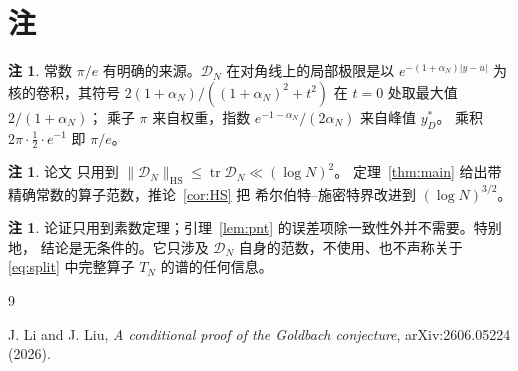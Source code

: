 \documentclass[12pt,a4paper]{amsart}
\numberwithin{equation}{section}
\theoremstyle{plain}
\theoremstyle{definition}
\newtheorem{remark}[theorem]{注}
\newcommand{\HS}{\mathrm{HS}}
\begin{document}
\section{注}\label{sec:remarks}

\begin{remark}\label{rem:constant}
常数 $\pi/e$ 有明确的来源。$\mathscr D_N$ 在对角线上的局部极限是以
$e^{-(1+\alpha_N)|y-u|}$ 为核的卷积，其符号
$2(1+\alpha_N)/((1+\alpha_N)^2+t^2)$ 在 $t=0$ 处取最大值 $2/(1+\alpha_N)$；
乘子 $\pi$ 来自权重，指数 $e^{-1-\alpha_N}/(2\alpha_N)$ 来自峰值 $y_D^*$。
乘积 $2\pi\cdot\frac12\cdot e^{-1}$ 即 $\pi/e$。
\end{remark}

\begin{remark}\label{rem:vsLL}
论文 \cite[命题 6.5]{LL} 只用到
$\|\mathcal D_N\|_{\HS}\le\operatorname{tr}\mathcal D_N\ll(\log N)^2$。
定理~\ref{thm:main} 给出带精确常数的算子范数，推论~\ref{cor:HS} 把
希尔伯特--施密特界改进到 $(\log N)^{3/2}$。
\end{remark}

\begin{remark}\label{rem:limitation}
论证只用到素数定理；引理~\ref{lem:pnt} 的误差项除一致性外并不需要。特别地，
结论是无条件的。它只涉及 $\mathcal D_N$ 自身的范数，不使用、也不声称关于
\eqref{eq:split} 中完整算子 $T_N$ 的谱的任何信息。
\end{remark}

\begin{thebibliography}{9}

J. Li and J. Liu,
\emph{A conditional proof of the Goldbach conjecture},
arXiv:2606.05224 (2026).

\end{thebibliography}
\end{document}
